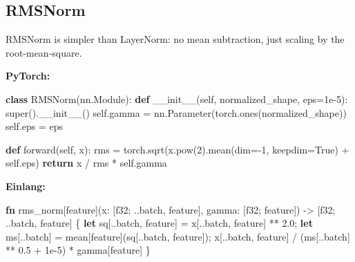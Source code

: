 \documentclass[11pt,titlepage]{article}
\newenvironment{Shaded}{}{}
\newcommand{\BuiltInTok}[1]{#1}
\newcommand{\ControlFlowTok}[1]{\textcolor[rgb]{0.00,0.44,0.13}{\textbf{#1}}}
\newcommand{\DataTypeTok}[1]{\textcolor[rgb]{0.56,0.13,0.00}{#1}}
\newcommand{\DecValTok}[1]{\textcolor[rgb]{0.25,0.63,0.44}{#1}}
\newcommand{\FloatTok}[1]{\textcolor[rgb]{0.25,0.63,0.44}{#1}}
\newcommand{\FunctionTok}[1]{\textcolor[rgb]{0.02,0.16,0.49}{#1}}
\newcommand{\KeywordTok}[1]{\textcolor[rgb]{0.00,0.44,0.13}{\textbf{#1}}}
\newcommand{\NormalTok}[1]{#1}
\newcommand{\OperatorTok}[1]{\textcolor[rgb]{0.40,0.40,0.40}{#1}}
\newcommand{\VariableTok}[1]{\textcolor[rgb]{0.10,0.09,0.49}{#1}}
\begin{document}
\vspace{2em}

\hypertarget{rmsnorm}{%
\subsection{RMSNorm}\label{rmsnorm}}

RMSNorm is simpler than LayerNorm: no mean subtraction, just scaling by
the root-mean-square.

\textbf{PyTorch:}

\begin{Shaded}
\begin{Highlighting}[]
\KeywordTok{class}\NormalTok{ RMSNorm(nn.Module):}
    \KeywordTok{def} \FunctionTok{__init__}\NormalTok{(}\VariableTok{self}\NormalTok{, normalized_shape, eps}\OperatorTok{=}\FloatTok{1e-5}\NormalTok{):}
        \BuiltInTok{super}\NormalTok{().}\FunctionTok{__init__}\NormalTok{()}
        \VariableTok{self}\NormalTok{.gamma }\OperatorTok{=}\NormalTok{ nn.Parameter(torch.ones(normalized_shape))}
        \VariableTok{self}\NormalTok{.eps }\OperatorTok{=}\NormalTok{ eps}

    \KeywordTok{def}\NormalTok{ forward(}\VariableTok{self}\NormalTok{, x):}
\NormalTok{        rms }\OperatorTok{=}\NormalTok{ torch.sqrt(x.}\BuiltInTok{pow}\NormalTok{(}\DecValTok{2}\NormalTok{).mean(dim}\OperatorTok{=-}\DecValTok{1}\NormalTok{, keepdim}\OperatorTok{=}\VariableTok{True}\NormalTok{) }\OperatorTok{+} \VariableTok{self}\NormalTok{.eps)}
        \ControlFlowTok{return}\NormalTok{ x }\OperatorTok{/}\NormalTok{ rms }\OperatorTok{*} \VariableTok{self}\NormalTok{.gamma}
\end{Highlighting}
\end{Shaded}

\textbf{Einlang:}

\begin{Shaded}
\begin{Highlighting}[]
\KeywordTok{fn}\NormalTok{ rms_norm[feature](x: }\OperatorTok{[}\DataTypeTok{f32}\NormalTok{; ..batch, feature}\OperatorTok{]}\NormalTok{, gamma: }\OperatorTok{[}\DataTypeTok{f32}\NormalTok{; feature}\OperatorTok{]}\NormalTok{)}
\NormalTok{    -> }\OperatorTok{[}\DataTypeTok{f32}\NormalTok{; ..batch, feature}\OperatorTok{]}
\OperatorTok{\{}
    \KeywordTok{let}\NormalTok{ sq}\OperatorTok{[}\NormalTok{..batch, feature}\OperatorTok{]}\NormalTok{ = x}\OperatorTok{[}\NormalTok{..batch, feature}\OperatorTok{]}\NormalTok{ ** }\DecValTok{2.0}\NormalTok{;}
    \KeywordTok{let}\NormalTok{ ms}\OperatorTok{[}\NormalTok{..batch}\OperatorTok{]}\NormalTok{ = mean}\OperatorTok{[}\NormalTok{feature}\OperatorTok{]}\NormalTok{(sq}\OperatorTok{[}\NormalTok{..batch, feature}\OperatorTok{]}\NormalTok{);}
\NormalTok{    x}\OperatorTok{[}\NormalTok{..batch, feature}\OperatorTok{]}\NormalTok{ / (ms}\OperatorTok{[}\NormalTok{..batch}\OperatorTok{]}\NormalTok{ ** }\DecValTok{0.5}\NormalTok{ + }\DecValTok{1}\NormalTok{e-}\DecValTok{5}\NormalTok{) * gamma}\OperatorTok{[}\NormalTok{feature}\OperatorTok{]}
\OperatorTok{\}}
\end{Highlighting}
\end{Shaded}
\end{document}
